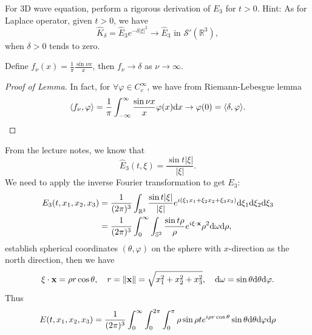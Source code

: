 \begin{pro}
  For 3D wave equation,
  perform a rigorous derivation of $E_3$ for $t>0$.
  Hint: As for Laplace operator,
  given $t>0$, we have
  \begin{displaymath}
    \hat{K}_{\delta} = \hat{E}_3e^{-\delta|\xi|^2} \to \hat{E}_3 \text{ in } \mathcal{S}'(\mathbb{R}^3),
  \end{displaymath}
  when $\delta>0$ tends to zero.
\end{pro}
\begin{sol}
  \begin{lem}
    Define $f_{\nu}(x)=\frac{1}{\pi}\frac{\sin\nu x}{x}$,
    then $f_{\nu}\to\delta$ as $\nu\to\infty$.
  \end{lem}
  \begin{proof}[Proof of Lemma]
    In fact,
    for $\forall \varphi\in C_c^{\infty}$,
    we have from Riemann-Lebesgue lemma
    \begin{displaymath}
      \langle f_{\nu}, \varphi\rangle = \frac{1}{\pi}\int_{-\infty}^{\infty}\frac{\sin\nu x}{x}\varphi(x)\mathrm{d} x \to \varphi(0) = \langle \delta, \varphi\rangle.
    \end{displaymath}
  \end{proof}
  From the lecture notes,
  we know that
  \begin{displaymath}
    \hat{E}_3(t, \xi) = \frac{\sin t|\xi|}{|\xi|}.
  \end{displaymath}
  We need to apply the inverse Fourier transformation to get $E_3$:
  \begin{align*}
    E_3(t, x_1, x_2, x_3) &= \frac{1}{(2\pi)^3}\int_{\mathbb{R}^3}\frac{\sin t|\xi|}{|\xi|}
                            e^{i(\xi_1x_1+\xi_2x_2+\xi_3x_3)}\mathrm{d} \xi_1\mathrm{d}\xi_2\mathrm{d}\xi_3 \\
    &= \frac{1}{(2\pi)^3}\int_0^{\infty}\int_{\mathbb{S}^2}\frac{\sin t\rho}{\rho}e^{i\xi\cdot \mathbf{x}}\rho^2\mathrm{d}\omega\mathrm{d} \rho,
  \end{align*}
  establish spherical coordinates $(\theta, \varphi)$ on the sphere
  with $x$-direction as the north direction,
  then we have
  \begin{displaymath}
    \xi\cdot\mathbf{x} = \rho r\cos\theta, \quad r = \|\mathbf{x}\| = \sqrt{x_1^2+x_2^2+x_3^2}, \quad
    \mathrm{d}\omega=\sin\theta\mathrm{d}\theta\mathrm{d}\varphi.
  \end{displaymath}
  Thus
  \begin{align*}
    E(t, x_1, x_2, x_3) &= \frac{1}{(2\pi)^3}\int_0^{\infty}\int_0^{2\pi}\int_0^{\pi}
                          \rho\sin \rho t e^{i\rho r\cos\theta}\sin\theta\dif\theta\dif\varphi\dif\rho \\

\end{align*}
\end{sol}
